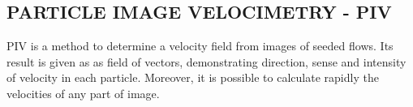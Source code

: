 
\subsection{PARTICLE IMAGE VELOCIMETRY - PIV}

PIV is a method to determine a velocity field from images of seeded flows\cite{Bastiaans}.
Its result is given as as field of vectors, demonstrating direction, sense and intensity of velocity in each particle. Moreover,
it is possible to calculate rapidly the velocities of any part of image.\\
